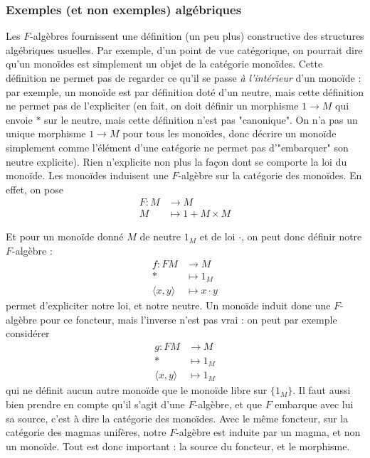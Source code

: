 \documentclass{article}
\begin{document}
 
\subsubsection{Exemples (et non exemples) algébriques}
 
    Les $F$-algèbres fournissent une définition (un peu plus) constructive des structures algébriques usuelles. Par exemple, d'un point de vue catégorique, on pourrait dire qu'un monoïdes est simplement un objet de la catégorie monoïdes. Cette définition ne permet pas de regarder ce qu'il se passe \textit{à l'intérieur} d'un monoïde : par exemple, un monoïde est par définition doté d'un neutre, mais cette définition ne permet pas de l'expliciter (en fait, on doit définir un morphisme $1 \rightarrow M$ qui envoie $*$ sur le neutre, mais cette définition n'est pas "canonique". On n'a pas un unique morphisme $1 \rightarrow M$ pour tous les monoïdes, donc décrire un monoïde simplement comme l'élément d'une catégorie ne permet pas d'"embarquer" son neutre explicite).  Rien n'explicite non plus la façon dont se comporte la loi du monoïde. Les monoïdes induisent une $F$-algèbre sur la catégorie des monoïdes. En effet, on pose 
\begin{align*}
    F : M & \rightarrow M \\
    M & \mapsto 1 + M \times M
\end{align*}

Et pour un monoïde donné $M$ de neutre $1_M$ et de loi $\cdot$, on peut donc définir notre $F$-algèbre : 
\begin{align*}
    f : F M & \rightarrow M \\
     * & \mapsto 1_M \\ 
     \langle x,y \rangle & \mapsto x \cdot y 
\end{align*}
permet d'expliciter notre loi, et notre neutre. Un monoïde induit donc une $F$-algèbre pour ce foncteur, mais l'inverse n'est pas vrai : on peut par exemple considérer 
\begin{align*}
    g : F M & \rightarrow M \\
     * & \mapsto 1_M \\ 
     \langle x,y \rangle & \mapsto 1_M 
\end{align*}
qui ne définit aucun autre monoïde que le monoïde libre sur $\{ 1_M \} $. Il faut aussi bien prendre en compte qu'il s'agit d'une $F$-algèbre, et que $F$ embarque avec lui sa source, c'est à dire la catégorie des monoïdes. Avec le même foncteur, sur la catégorie des magmas unifères, notre $F$-algèbre est induite par un magma, et non un monoïde. Tout est donc important : la source du foncteur, et le morphisme. \\ 
\end{document}
